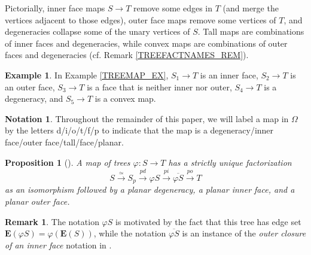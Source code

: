 \documentclass[a4paper,10pt
,draft
]{article}%
\numberwithin{equation}{section}
\numberwithin{figure}{section}
\newtheorem{proposition}[equation]{Proposition}%
\theoremstyle{definition} %
\newtheorem{example}[equation]{Example}%
\newtheorem{remark}[equation]{Remark}%
\newtheorem{notation}[equation]{Notation}%
\newcommand{\1}{\ensuremath{\mathbbm 1}}%
\begin{document}
Pictorially, inner face maps 
$S \to T$ remove some edges in $T$
(and merge the vertices adjacent to those edges),
outer face maps remove some vertices of $T$,
and degeneracies collapse some of the unary vertices of $S$.
Tall maps are combinations of inner faces and degeneracies, while
convex maps are combinations of outer faces and degeneracies (cf. Remark \ref{TREEFACTNAMES_REM}).


\begin{example}
	In Example \ref{TREEMAP_EX},
	$S_1 \to T$ is an inner face,
	$S_2 \to T$ is an outer face,
	$S_3 \to T$ is a face that is neither inner nor outer,
	$S_4 \to T$ is a degeneracy,
        and $S_5 \to T$ is a convex map.
\end{example}


\begin{notation}\label{MAPLABELS_NOT}
	Throughout the remainder of this paper,
        we will label a 
        map in $\Omega$
        by the letters d/i/o/t/f/p
        to indicate that the map is
        a degeneracy/inner face/outer face/tall/face/planar.
\end{notation}


\begin{proposition}[{\cite[Prop. 2.2]{BP_edss}}]
      \label{TREEFACT_PROP}
      A map of trees $\varphi \colon S \to T$ %
      has a strictly unique factorization
      \begin{equation}\label{TREEFACT_EQ}
              S \xrightarrow{\simeq}
              S_p \xrightarrow{pd} 
              \varphi S \xrightarrow{pi} 
              \overline{\varphi S} \xrightarrow{po} T
      \end{equation}
      as an isomorphism followed by a planar degeneracy, a planar inner face, and a planar outer face.
\end{proposition}


\begin{remark}\label{TREEFACT_REM}
      The notation $\varphi S$ is motivated by the fact that this tree has edge set
      $\boldsymbol{E}(\varphi S) = \varphi (\boldsymbol{E}(S))$,
      while the 
      notation $\overline{\varphi S}$ is an instance of the 
      \emph{outer closure of an inner face}
      notation in \cite[Not. 2.14]{BP_edss}.
\end{remark}
\end{document}
